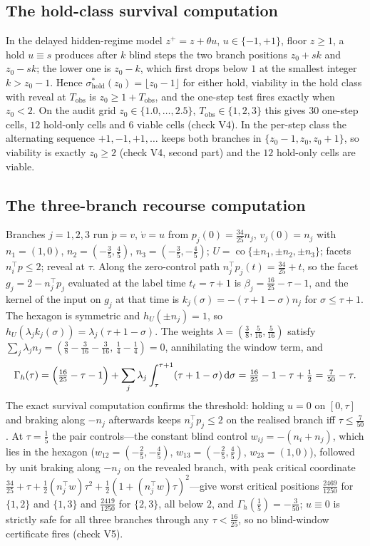 \documentclass[11pt,a4paper]{article}
\theoremstyle{plain}
\theoremstyle{definition}
\theoremstyle{remark}
\newcommand{\Tobs}{T_{\mathrm{obs}}}
\newcommand{\co}{\operatorname{co}}
\newcommand{\dd}{\,\mathrm{d}}
\begin{document}
\subsection{The hold-class survival computation}\label{S:holdclass}
In the delayed hidden-regime model $z^+=z+\theta u$, $u\in\{-1,+1\}$, floor $z\ge1$, a hold $u\equiv s$ produces after $k$ blind steps the two branch positions $z_0+s k$ and $z_0-sk$; the lower one is $z_0-k$, which first drops below $1$ at the smallest integer $k>z_0-1$. Hence $\sigma^*_{\mathrm{hold}}(z_0)=\lfloor z_0-1\rfloor$ for either hold, viability in the hold class with reveal at $\Tobs$ is $z_0\ge1+\Tobs$, and the one-step test fires exactly when $z_0<2$. On the audit grid $z_0\in\{1.0,\dots,2.5\}$, $\Tobs\in\{1,2,3\}$ this gives $30$ one-step cells, $12$ hold-only cells and $6$ viable cells (check V4). In the per-step class the alternating sequence $+1,-1,+1,\dots$ keeps both branches in $\{z_0-1,z_0,z_0+1\}$, so viability is exactly $z_0\ge2$ (check V4, second part) and the $12$ hold-only cells are viable.

\subsection{The three-branch recourse computation}\label{S:threebranch}
Branches $j=1,2,3$ run $\dot p=v$, $\dot v=u$ from $p_j(0)=\tfrac{34}{25}n_j$, $v_j(0)=n_j$ with $n_1=(1,0)$, $n_2=(-\tfrac35,\tfrac45)$, $n_3=(-\tfrac35,-\tfrac45)$; $U=\co\{\pm n_1,\pm n_2,\pm n_3\}$; facets $n_i^\top p\le2$; reveal at $\tau$. Along the zero-control path $n_j^\top p_j(t)=\tfrac{34}{25}+t$, so the facet $g_j=2-n_j^\top p_j$ evaluated at the label time $t_\ell=\tau+1$ is $\beta_j=\tfrac{16}{25}-\tau-1$, and the kernel of the input on $g_j$ at that time is $k_j(\sigma)=-(\tau+1-\sigma)n_j$ for $\sigma\le\tau+1$. The hexagon is symmetric and $h_U(\pm n_j)=1$, so $h_U(\lambda_jk_j(\sigma))=\lambda_j(\tau+1-\sigma)$. The weights $\lambda=(\tfrac38,\tfrac5{16},\tfrac5{16})$ satisfy $\sum_j\lambda_jn_j=(\tfrac38-\tfrac3{16}-\tfrac3{16},\,\tfrac14-\tfrac14)=0$, annihilating the window term, and
\[
\Gamma_h(\tau)=\Bigl(\tfrac{16}{25}-\tau-1\Bigr)+\sum_j\lambda_j\int_\tau^{\tau+1}(\tau+1-\sigma)\dd\sigma=\tfrac{16}{25}-1-\tau+\tfrac12=\tfrac7{50}-\tau .
\]
The exact survival computation confirms the threshold: holding $u=0$ on $[0,\tau]$ and braking along $-n_j$ afterwards keeps $n_j^\top p_j\le2$ on the realised branch iff $\tau\le\tfrac7{50}$. At $\tau=\tfrac15$ the pair controls---the constant blind control $w_{ij}=-(n_i+n_j)$, which lies in the hexagon ($w_{12}=(-\tfrac25,-\tfrac45)$, $w_{13}=(-\tfrac25,\tfrac45)$, $w_{23}=(1,0)$), followed by unit braking along $-n_j$ on the revealed branch, with peak critical coordinate $\tfrac{34}{25}+\tau+\tfrac12(n_j^\top w)\tau^2+\tfrac12(1+(n_j^\top w)\tau)^2$---give worst critical positions $\tfrac{2469}{1250}$ for $\{1,2\}$ and $\{1,3\}$ and $\tfrac{2419}{1250}$ for $\{2,3\}$, all below $2$, and $\Gamma_h(\tfrac15)=-\tfrac3{50}$; $u\equiv0$ is strictly safe for all three branches through any $\tau<\tfrac{16}{25}$, so no blind-window certificate fires (check V5).
\end{document}
